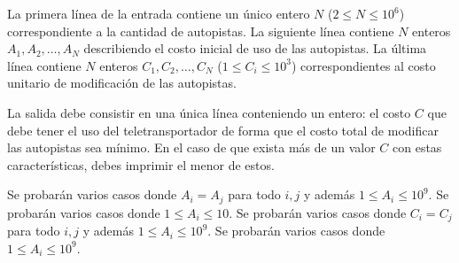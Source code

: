 \documentclass{oci}
\begin{document}
\begin{inputDescription}
  La primera línea de la entrada contiene un único entero $N$ ($2 \leq N \leq
  10^6$) correspondiente a la cantidad de autopistas.
  La siguiente línea contiene $N$ enteros $A_1, A_2, \ldots, A_N$ describiendo el
  costo inicial de uso de las autopistas.
  La última línea contiene $N$ enteros $C_1, C_2, \ldots, C_N$ ($1 \leq C_i \leq
  10^3$) correspondientes al costo unitario de modificación de las autopistas.
\end{inputDescription}

\begin{outputDescription}
  La salida debe consistir en una única línea conteniendo un entero: el costo
  $C$ que debe tener el uso del teletransportador de forma que el costo total de
  modificar las autopistas sea mínimo.
  En el caso de que exista más de un valor $C$ con estas características, debes
  imprimir el menor de estos.
\end{outputDescription}

\begin{scoreDescription}
   Se probarán varios casos donde $A_i=A_j$ para todo $i,j$ y además
  $1 \leq A_i \leq 10^9$.
   Se probarán varios casos donde $1 \leq A_i \leq 10$.
   Se probarán varios casos donde $C_i=C_j$ para todo $i,j$ y además
  $1\leq A_i\leq 10^9$.
   Se probarán varios casos donde $1\leq A_i\leq 10^9$.
\end{scoreDescription}

\begin{sampleDescription}
\end{sampleDescription}
\end{document}
